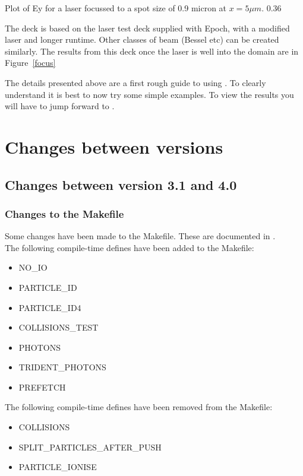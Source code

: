  {Plot of Ey for a laser focussed to a spot size of 0.9 micron at $x=5\mu m$.}
  {0.36}

The deck is based on the laser test deck supplied with Epoch, with a modified
laser and longer runtime. Other classes of beam (Bessel etc) can be created
similarly. The results from this deck once the laser is well into the domain
are in Figure~\ref{focus}

The details presented above are a first rough guide to using {\EPOCH}. To
clearly understand {\EPOCH} it is best to now try some simple examples. To
view the results you will have to jump forward to .



\appendix
\section{Changes between versions}

\subsection{Changes between version 3.1 and 4.0}

\subsubsection{Changes to the Makefile}

Some changes have been made to the Makefile. These are documented in
.\\

\noindent The following compile-time defines have been added to the Makefile:
\begin{itemize}
\item NO\_IO
\item PARTICLE\_ID
\item PARTICLE\_ID4
\item COLLISIONS\_TEST
\item PHOTONS
\item TRIDENT\_PHOTONS
\item PREFETCH
\end{itemize}
\bigskip

\noindent The following compile-time defines have been removed from the
   Makefile:
\begin{itemize}
\item COLLISIONS
\item SPLIT\_PARTICLES\_AFTER\_PUSH
\item PARTICLE\_IONISE
\end{itemize}

